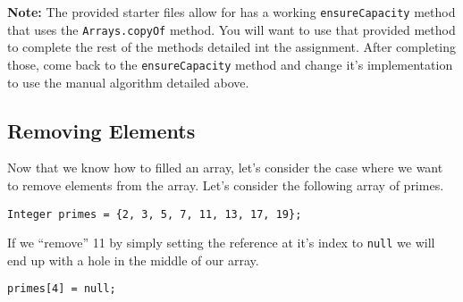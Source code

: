 \documentclass[a4paper]{article}
\begin{document}
\textbf{Note:} The provided starter files allow for has a working \lstinline|ensureCapacity| method that uses the 
\lstinline|Arrays.copyOf| method. You will want to use that provided method to complete the rest of the methods
detailed int the assignment. After completing those, come back to the \lstinline|ensureCapacity| method and change
it's implementation to use the manual algorithm detailed above.

\subsection*{Removing Elements}

Now that we know how to filled an array, let's consider the case where we want to remove
elements from the array. Let's consider the following array of primes.  

\begin{minipage}{0.59\textwidth}
\begin{lstlisting}[frame=trBL, basicstyle=\small]
Integer primes = {2, 3, 5, 7, 11, 13, 17, 19};
\end{lstlisting}
\end{minipage}
\hfill
\begin{minipage}{0.39\textwidth}
\begin{figure}[H]
	\centering
\end{figure}
\vspace{0.3cm}
\end{minipage}

If we ``remove'' 11 by simply setting the reference at it's index to
\lstinline|null| we will end up with a hole in the middle of our array. 

\begin{minipage}{0.59\textwidth}
\begin{lstlisting}[frame=trBL, basicstyle=\small]
primes[4] = null;
\end{lstlisting}
\end{minipage}
\hfill
\begin{minipage}{0.39\textwidth}
\begin{figure}[H]
	\centering
\end{figure}
\vspace{0.3cm}
\end{minipage}
\end{document}
